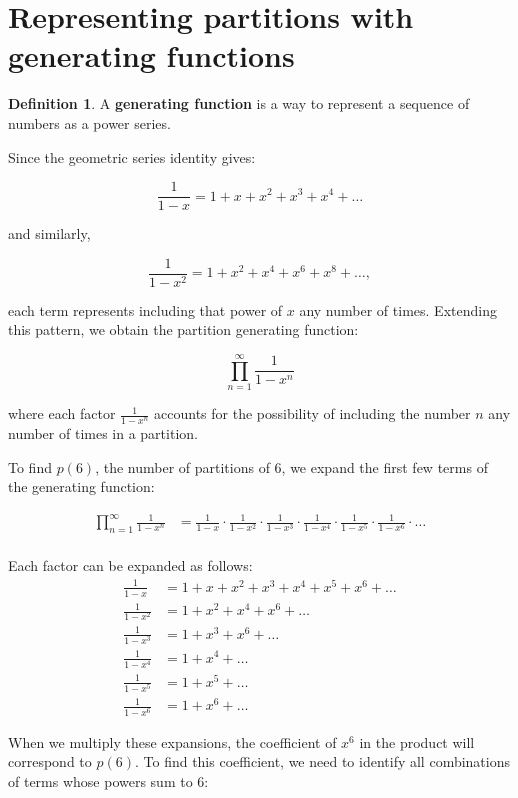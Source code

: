 \documentclass{article}
\theoremstyle{definition}
\newtheorem{definition}{Definition}
\begin{document}
\section{Representing partitions with generating functions}

\begin{definition}
    A \textbf{generating function} is a way to represent a sequence of numbers as a power series. 
\end{definition}

\noindent
Since the geometric series identity gives:

\[
\frac{1}{1 - x} = 1 + x + x^2 + x^3 + x^4 + \dots
\]

\noindent
and similarly,

\[
\frac{1}{1 - x^2} = 1 + x^2 + x^4 + x^6 + x^8 + \dots,
\]

\noindent
each term represents including that power of \( x \) any number of times. Extending this pattern, we obtain
the partition generating function:

\[
\prod_{n=1}^{\infty} \frac{1}{1 - x^n}
\]

\noindent
where each factor \( \frac{1}{1 - x^n} \) accounts for the possibility of including the number \( n \) any
number of times in a partition.

\newpage

To find $p(6)$, the number of partitions of 6, we expand the first few terms of the generating function:
    
\begin{align}
\prod_{n=1}^{\infty} \frac{1}{1 - x^n} &= \frac{1}{1-x} \cdot \frac{1}{1-x^2} \cdot \frac{1}{1-x^3} \cdot \frac{1}{1-x^4} \cdot \frac{1}{1-x^5} \cdot \frac{1}{1-x^6} \cdot \ldots \\
\end{align}

Each factor can be expanded as follows:
\begin{align}
\frac{1}{1-x} &= 1 + x + x^2 + x^3 + x^4 + x^5 + x^6 + \ldots \\
\frac{1}{1-x^2} &= 1 + x^2 + x^4 + x^6 + \ldots \\
\frac{1}{1-x^3} &= 1 + x^3 + x^6 + \ldots \\
\frac{1}{1-x^4} &= 1 + x^4 + \ldots \\
\frac{1}{1-x^5} &= 1 + x^5 + \ldots \\
\frac{1}{1-x^6} &= 1 + x^6 + \ldots
\end{align}

When we multiply these expansions, the coefficient of $x^6$ in the product will correspond to $p(6)$. To find this coefficient, we need to identify all combinations of terms whose powers sum to 6:
\end{document}
